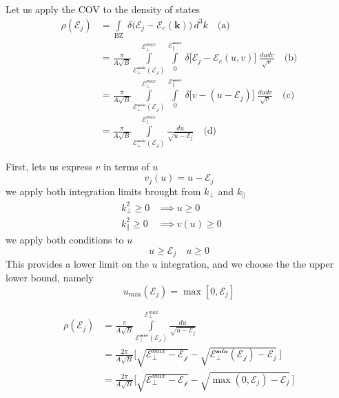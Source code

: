 Let us apply the COV to the density of states
\begin{align}
\rho(\mathcal{E}_{j}) &= \int\limits_{\text{BZ}}  \; \delta \Big( \mathcal{E}_{j}-\mathcal{E}_{c}(\mathbf{k}) \Big)\, d^{3}k \quad \text{(a)}\\
&= \frac{\pi}{A\sqrt{ B }}\int\limits_{ \mathcal{E_{\perp}^{min}}(\mathcal{E_{j}})}^{\mathcal{E}_{\perp}^{max}}\int\limits_{0}^{\mathcal{E_{\parallel}^{max}}} \, \delta \Big[ \mathcal{E}_{j}-\mathcal{E}_{c}(u,v) \Big] \; \frac{dudv}{\sqrt{ v }} \quad \text{(b)}\\
&=\frac{\pi}{A\sqrt{ B }}\int\limits_{ \mathcal{E_{\perp}^{min}}(\mathcal{E_{j}})}^{\mathcal{E}_{\perp}^{max}}\int\limits_{0}^{\mathcal{E_{\parallel}^{max}}} \,  \delta \Big[ v - (u-\mathcal{E}_{j}) \Big]\; \frac{dudv}{\sqrt{ v }} \quad \text{(c)} \\
&= \frac{\pi}{A\sqrt{ B }}\int\limits_{ \mathcal{E_{\perp}^{min}}(\mathcal{E_{j}})}^{\mathcal{E}_{\perp}^{max}} \frac{du}{\sqrt{ u - \mathcal{E}_{j} }} \quad \text{(d)}
\label{eq:quadratic_intraband_density_of_states}
\end{align}

\begin{tcolorbox}[title={Note: Integration Limits}]

First, lets us express $v$ in terms of $u$
\begin{equation}
v_{j}(u) = u-\mathcal{E}_{j}
\label{eq:quadratic_intraband_v_of_u}
\end{equation}
we apply both integration limits brought from $k_{\perp}$ and $k_{\parallel}$ 
\begin{align}
 k_{\perp}^{2}\geq0 &\implies u\geq 0  && \\ 
 k_{\parallel}^{2}\geq0 &\implies v(u)\geq 0 
\label{eq:quadratic_intraband_limit_conditions}
\end{align}
we apply both conditions to $u$ 
\begin{equation}
u\geq \mathcal{E}_{j} \quad u\geq 0
\label{eq:quadratic_intraband_u_conditions}
\end{equation}
This provides a lower limit on the $u$ integration, and we choose the the upper lower bound, namely
\begin{equation}
u_{min}(\mathcal{E}_{j}) = \max \left[ 0, \mathcal{E}_{j} \right]
\label{eq:quadratic_intraband_u_min}
\end{equation}
\end{tcolorbox}

\begin{align}
\rho(\mathcal{E}_{j})&=\frac{\pi}{A\sqrt{ B }}\int \limits_{ \mathcal{E_{\perp}^{min}}(\mathcal{E_{j}})}^{\mathcal{E}_{\perp}^{max}}\frac{du}{\sqrt{ u - \mathcal{E}_{j} }}  \\
 & =\frac{2\pi}{A\sqrt{ B }} \Bigg[ \sqrt{ \mathcal{E}_{\perp}^{max}-\mathcal{E_{j}} } -\sqrt{  \mathcal{E_{\perp}^{min}}(\mathcal{E_{j}})-\mathcal{E}_{j} }\  \Bigg] \\
& =\frac{2\pi}{A\sqrt{ B }} \Bigg[ \sqrt{ \mathcal{E}_{\perp}^{max}-\mathcal{E_{j}} } -\sqrt{  \max(0,\mathcal{E}_{j})-\mathcal{E}_{j} }\  \Bigg]
\label{eq:quadratic_intraband_density_of_states_final}
\end{align}

